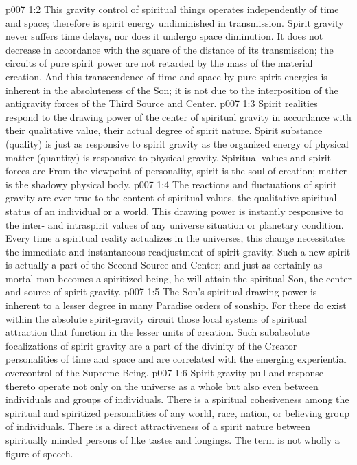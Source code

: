 \vs p007 1:2 This gravity control of spiritual things operates independently of time and space; therefore is spirit energy undiminished in transmission. Spirit gravity never suffers time delays, nor does it undergo space diminution. It does not decrease in accordance with the square of the distance of its transmission; the circuits of pure spirit power are not retarded by the mass of the material creation. And this transcendence of time and space by pure spirit energies is inherent in the absoluteness of the Son; it is not due to the interposition of the antigravity forces of the Third Source and Center.
\vs p007 1:3 Spirit realities respond to the drawing power of the center of spiritual gravity in accordance with their qualitative value, their actual degree of spirit nature. Spirit substance (quality) is just as responsive to spirit gravity as the organized energy of physical matter (quantity) is responsive to physical gravity. Spiritual values and spirit forces are  From the viewpoint of personality, spirit is the soul of creation; matter is the shadowy physical body.
\vs p007 1:4 The reactions and fluctuations of spirit gravity are ever true to the content of spiritual values, the qualitative spiritual status of an individual or a world. This drawing power is instantly responsive to the inter\hyp{} and intraspirit values of any universe situation or planetary condition. Every time a spiritual reality actualizes in the universes, this change necessitates the immediate and instantaneous readjustment of spirit gravity. Such a new spirit is actually a part of the Second Source and Center; and just as certainly as mortal man becomes a spiritized being, he will attain the spiritual Son, the center and source of spirit gravity.
\pc \vs p007 1:5 The Son’s spiritual drawing power is inherent to a lesser degree in many Paradise orders of sonship. For there do exist within the absolute spirit\hyp{}gravity circuit those local systems of spiritual attraction that function in the lesser units of creation. Such subabsolute focalizations of spirit gravity are a part of the divinity of the Creator personalities of time and space and are correlated with the emerging experiential overcontrol of the Supreme Being.
\vs p007 1:6 Spirit\hyp{}gravity pull and response thereto operate not only on the universe as a whole but also even between individuals and groups of individuals. There is a spiritual cohesiveness among the spiritual and spiritized personalities of any world, race, nation, or believing group of individuals. There is a direct attractiveness of a spirit nature between spiritually minded persons of like tastes and longings. The term  is not wholly a figure of speech.
